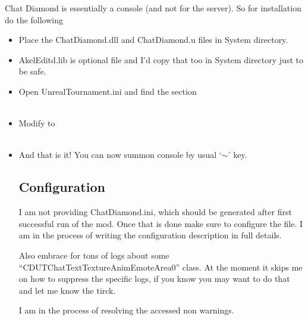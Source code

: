 \documentclass{article}
\theoremstyle{definition}
\newcommand{\FileColor}[1]{{\color{Purple} #1}}
\newcommand{\FolderColor}[1]{{\color{mygray} #1}}
\begin{document}
Chat Diamond is essentially a console (and not for the server).  So for installation do the following
\begin{itemize}
\item Place the \FileColor{ChatDiamond.dll} and \FileColor{ChatDiamond.u} files in \FolderColor{System} directory.
\item \FileColor{AkelEditd.lib} is optional file and I'd copy that too in \FolderColor{System} directory just to be safe.
\item Open \FileColor{UnrealTournament.ini} and find the section \\

\\

\item Modify to \\

\\

\item And that is it!  You can now summon console by usual `$\sim$' key.

\subsection{Configuration}
I am not providing {\color{purple}ChatDiamond.ini}, which should be generated after first successful run of the mod.  
Once that is done make sure to configure the file.  I am in the process of writing the configuration description in full details.

Also embrace for tons of logs about some  ``CDUTChatTextTextureAnimEmoteArea0'' class.  At the moment it skips me on how to suppress the specific logs, if you know you may want to do that and let me know the tirck.

I am in the process of resolving the accessed non warnings.

\end{itemize}
\end{document}
